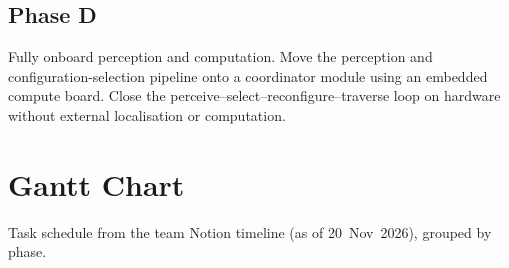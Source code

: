 \documentclass[12pt,a4paper]{article}
\begin{document}
\subsection{Phase D}
Fully onboard perception and computation. Move the perception and
configuration-selection pipeline onto a coordinator module using an embedded
compute board. Close the perceive--select--reconfigure--traverse loop on
hardware without external localisation or computation.

\clearpage
\section{Gantt Chart}
\label{sec:gantt}

Task schedule from the team Notion timeline (as of 20~Nov~2026), grouped by phase.
\end{document}
